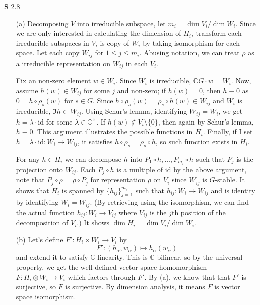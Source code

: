 \documentclass[a4paper, 12pt]{article}
\theoremstyle{Mydefinition}
\theoremstyle{Mytheorem}
\begin{document}
\noindent \textbf{S} 2.8
\begin{enumerate}
    \item[(a)] Decomposing $V$ into irreducible subspace, let $m_i = \dim V_i/\dim W_i$. Since we are only interested in calculating the dimension of $H_i$, transform each irreducible subspaces in $V_i$ is copy of $W_i$ by taking isomorphism for each space. Let each copy $W_{ij}$ for $1\leq j\leq m_i$. Abusing notation, we can treat $\rho$ as a irreducible representation on $W_{ij}$ in each $V_i$.
    
    Fix an non-zero element $w\in W_i$. Since $W_i$ is irreducible, $\mathbb{C}G\cdot w = W_i$. Now, assume $h(w)\in W_{ij}$ for some $j$ and non-zero; if $h(w) = 0$, then $h\equiv 0$ as $0 = h\circ \rho_s(w)$ for $s\in G$. Since $h\circ \rho_s(w) = \rho_s\circ h(w)\in W_{ij}$ and $W_i$ is irreducible, $\Im h\subset W_{ij}$. Using Schur's lemma, identifying $W_{ij}=W_i$, we get $h= \lambda\cdot \mathrm{id}$ for some $\lambda\in \mathbb{C}^\times$. If $h(w)\not\in V_i\setminus \{0\}$, then again by Schur's lemma, $h\equiv 0$. This argument illustrates the possible functions in $H_i$. Finally, if I set $h=\lambda\cdot\mathrm{id}:W_i\rightarrow W_{ij}$, it satisfies $h\circ \rho_s = \rho_s\circ h$, so such function exists in $H_i$.
    
    For any $h\in H_i$ we can decompose $h$ into $P_1\circ h, \ldots, P_{m_i}\circ h$ such that $P_j$ is the projection onto $W_{ij}$. Each $P_{j}\circ h$ is a multiple of $\mathrm{id}$ by the above argument, note that $P_j\circ \rho = \rho\circ P_j$ for representation $\rho$ on $V_i$ since $W_{ij}$ is $G$-stable. It shows that $H_i$ is spanned by $\{h_{ij}\}_{j=1}^{m_i}$ such that $h_{ij}:W_i\rightarrow W_{ij}$ and is identity by identifying $W_i = W_{ij}$. (By retrieving using the isomorphism, we can find the actual function $h_{ij}:W_i\rightarrow V_{ij}$ where $V_{ij}$ is the $j$th position of the decomposition of $V_i$.) It shows $\dim H_i = \dim V_i/\dim W_i$.
    
    \item[(b)] Let's define $F':H_i\times W_i\rightarrow V_i$ by
    \begin{equation}
        F':(h_\alpha, w_\alpha)\mapsto h_\alpha(w_\alpha)
    \end{equation}
    and extend it to satisfy $\mathbb{C}$-linearity. This is $\mathbb{C}$-bilinear, so by the universal property, we get the well-defined vector space homomorphism $F:H_i\otimes W_i\rightarrow V_i$ which factors through $F'$. By (a), we know that that $F'$ is surjective, so $F$ is surjective. By dimension analysis, it means $F$ is vector space isomorphism.
    

\end{enumerate}
\end{document}
